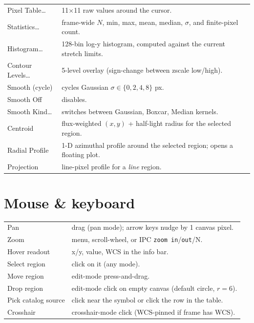 \documentclass[11pt,a4paper]{article}
\begin{document}
\begin{tabular}{@{}>{\sffamily}lp{}@{}}
\toprule
Pixel Table\dots   & 11$\times$11 raw values around the cursor. \\
Statistics\dots    & frame-wide $N$, min, max, mean, median, $\sigma$,
                     and finite-pixel count. \\
Histogram\dots     & 128-bin log-y histogram, computed against the
                     current stretch limits. \\
Contour Levels\dots & 5-level overlay (sign-change between zscale low/high). \\
Smooth (cycle)     & cycles Gaussian $\sigma \in \{0, 2, 4, 8\}$ px. \\
Smooth Off         & disables. \\
Smooth Kind\dots   & switches between Gaussian, Boxcar, Median kernels. \\
Centroid           & flux-weighted $(x, y)$ + half-light radius for the
                     selected region. \\
Radial Profile     & 1-D azimuthal profile around the selected region;
                     opens a floating plot. \\
Projection         & line-pixel profile for a \emph{line} region. \\
\bottomrule
\end{tabular}

\section{Mouse \& keyboard}

\begin{tabular}{@{}>{\sffamily}lp{}@{}}
\toprule
Pan                 & drag (pan mode); arrow keys nudge by 1 canvas pixel. \\
Zoom                & menu, scroll-wheel, or IPC \texttt{zoom in}/\texttt{out}/N. \\
Hover readout       & x/y, value, WCS in the info bar. \\
Select region       & click on it (any mode). \\
Move region         & edit-mode press-and-drag. \\
Drop region         & edit-mode click on empty canvas (default circle, $r=6$). \\
Pick catalog source & click near the symbol or click the row in the table. \\
Crosshair           & crosshair-mode click (WCS-pinned if frame has WCS). \\
\bottomrule
\end{tabular}
\end{document}
